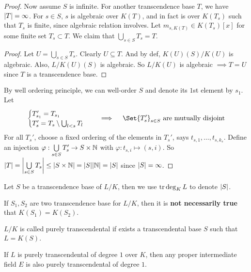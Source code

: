 \begin{theorem}
\begin{proof}
    Now assume $S$ is infinite.
    For another transcendence base $T$, we have $\abs{T} = \infty$.
    For $s \in S$, $s$ is algebraic over $K(T)$, and
    in fact is over $K(T_s)$ such that $T_s$ is finite,
    since algebraic relation involves.
    Let $m_{s, K(T)} \in K(T_s)[x]$ for some finite set $T_s \subset T$.
    We claim that $\bigcup\limits_{s\in S} T_s = T$.
    \begin{proof}
      Let $U = \bigcup\limits_{s\in S} T_s$.
      Clearly $U \subseteq T$. And by def, $K(U)(S)/K(U)$ is algebraic.
      Also, $L/K(U)(S)$ is algebraic. So $L/K(U)$ is algebraic
      $\implies T = U$ since $T$ is a transcendence base.
    \end{proof}
    By well ordering principle, we can well-order $S$ and denote its
    $1$st element by $s_1$.
    Let
    \[
      \begin{cases}
        T_{s_1}' = T_{s_1} \\
        T_{s}' = T_s \setminus \bigcup_{l < s} T_l
      \end{cases}
      \quad \implies \quad
      \Set{ T_s' }_{s\in S} \text{~are mutually disjoint}
    \]
    For all $T_s'$, choose a fixed ordering of the elements in $T_s'$, says
    $t_{s,1}, \dots, t_{s, {k_s}}$. Define an injection
    $\varphi: \bigcup\limits_{s\in S} T_s' \to S\times \Nb$ with
    $\varphi: t_{s,i} \mapsto (s, i)$.
    So $\abs{T} = \abs*{\bigcup\limits_{s\in S} T_s} \le \abs{S\times \Nb}
    = \abs{S}\abs{\Nb} = \abs{S}$ since $\abs{S} = \infty$.
  \end{proof}
\end{theorem}

\begin{definition}
  Let $S$ be a transcendence base of $L/K$, then we use
  $\trdeg_K L$ to denote $\abs{S}$.
\end{definition}

\begin{remark}
  If $S_1, S_2$ are two transcendence base for $L/K$, then it is {\bf not
  necessarily true} that $K(S_1) = K(S_2)$.
\end{remark}

\begin{definition}
  $L/K$ is called purely transcendental if exists a transcendental base $S$
  such that $L = K(S)$.
\end{definition}

\begin{theorem}
  If $L$ is purely transcendental of degree $1$ over $K$, then any proper
  intermediate field $E$ is also purely transcendental of degree $1$.
\end{theorem}

